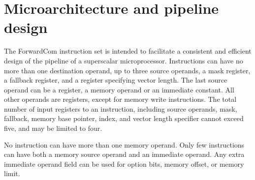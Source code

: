 \documentclass[forwardcom.tex]{subfiles}
\begin{document}
\RaggedRight

\chapter{Microarchitecture and pipeline design}
The ForwardCom instruction set is intended to facilitate a consistent and efficient design of the pipeline of a superscalar microprocessor. Instructions can have no more than one destination operand, up to three source operands, a mask register, a fallback register, and a register specifying vector length. The last source operand can be a register, a memory operand or an immediate constant. All other operands are registers, except for memory write instructions. The total number of input registers to an instruction, including source operands, mask, fallback, memory base pointer, index, and vector length specifier cannot exceed five, and may be limited to four.
\vspace{2mm}

No instruction can have more than one memory operand. Only few instructions can have both a memory source operand and an immediate operand. Any extra immediate operand field can be used for option bits, memory offset, or memory limit. 
\vspace{2mm}
\end{document}
